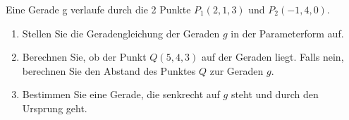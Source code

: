 \begin{ExerciseBlock}
Eine Gerade g verlaufe durch die 2 Punkte $P_1(2,1,3)$ und $P_2(-1,4,0)$.
 \begin{enumerate}[label=\alph*)]
	\item Stellen Sie die Geradengleichung der Geraden $g$ in der Parameterform auf.
	\item Berechnen Sie, ob der Punkt $Q(5,4,3)$ auf der Geraden liegt. Falls nein, berechnen Sie den Abstand des Punktes $Q$ zur Geraden $g$.
	\item Bestimmen Sie eine Gerade, die senkrecht auf $g$ steht und durch den Ursprung geht.
\end{enumerate}

\end{ExerciseBlock}
